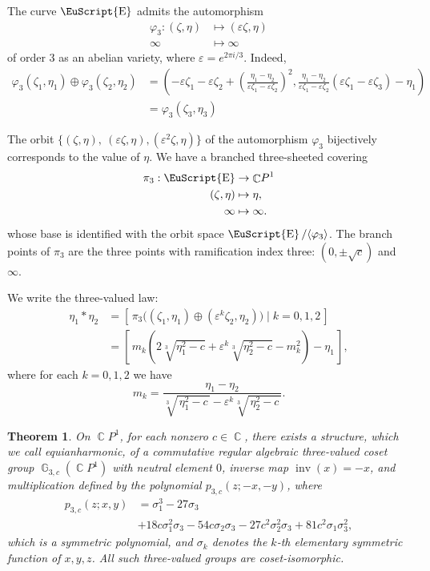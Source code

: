 \documentclass[14pt, dvipsnames]{extarticle}
\theoremstyle{plain}
\newtheorem{theorem}{Theorem}
\theoremstyle{definition}
\theoremstyle{remark}
\let\phi\varphi
\DeclareMathOperator{\E}{\EuScript{E}}
\DeclareMathOperator{\G}{\mathbb{G}}
\DeclareMathOperator{\inv}{\mathrm{inv}}
\DeclareMathOperator{\Cc}{\mathbb{C}}
\renewcommand{\epsilon}{\varepsilon}
\begin{document}
The curve $\E$ admits the automorphism
$$\begin{aligned}
\phi_3: (\zeta, \eta)&\mapsto (\epsilon \zeta, \eta)\\
\infty&\mapsto \infty
\end{aligned}$$
of order $3$ as an abelian variety, where $\epsilon = e^{2\pi i/3}$. Indeed,
$$\begin{aligned}
\phi_3(\zeta_1, \eta_1)\oplus \phi_3(\zeta_2, \eta_2) &= \left(- \epsilon \zeta_1 - \epsilon \zeta_2 + \left(\frac{\eta_1 - \eta_2}{\epsilon \zeta_1 - \epsilon \zeta_2}\right)^2, \frac{\eta_1 - \eta_2}{\epsilon \zeta_1-\epsilon \zeta_2}(\epsilon \zeta_1 - \epsilon \zeta_3) - \eta_1 \right)\\
&= \phi_3(\zeta_3, \eta_3)
\end{aligned}$$   

The orbit $\{(\zeta, \eta),\ (\epsilon \zeta, \eta), (\epsilon^2 \zeta, \eta)\}$ of the automorphism $\phi_3$ bijectively corresponds to the value of $\eta$. We have a branched three-sheeted covering
\[
\begin{aligned}
\pi_3:\E&\to \Cc\!P^1\\
(\zeta,\eta)&\mapsto \eta,\\
\infty&\mapsto\infty.
\end{aligned}
\]
whose base is identified with the orbit space $\E/\langle \phi_3 \rangle$. {The branch points of $\pi_3$ are the three points with ramification index three: $(0, \pm\sqrt{c})$ and $\infty$.} 

We write the three-valued law:
\begin{align}
\eta_1\ast \eta_2&=[\,\pi_3\bigl((\zeta_1,\eta_1)\oplus (\epsilon^k \zeta_2,\eta_2)\bigr)\mid k=0,1,2\,]\nonumber\\
&=\left[\,m_k\!\left(2\sqrt[3]{\eta_1^2-c}+\epsilon^k\sqrt[3]{\eta_2^2-c}-m_k^2\right)-\eta_1\,\right],\label{3_valued_law_multiset}
\end{align}
where for each $k = 0, 1, 2$ we have
$$m_k=\frac{\eta_1-\eta_2}{\sqrt[3]{\,\eta_1^2-c\,}-\epsilon^k\sqrt[3]{\,\eta_2^2-c\,}}.$$

\begin{theorem}\label{3-valued_group}
On $\Cc\!P^1$, for each nonzero $c\in\Cc$, there exists a structure, which we call equianharmonic, of a {commutative regular} algebraic three-valued coset group $\G_{3, c}(\Cc\!P^1)$ with neutral element $0$, inverse map $\inv(x) = -x$, and multiplication defined by the polynomial $p_{3, c}(z; -x, -y)$, where
$$\begin{aligned}
p_{3, c}(z; x, y) &= \sigma_1^3 - 27\sigma_3\\
&+ 18 c \sigma_1^2 \sigma_3 - 54 c \sigma_2 \sigma_3 - 27 c^2 \sigma_2^2 \sigma_3 + 81 c^2 \sigma_1 \sigma_3^2,
\end{aligned}$$
which is a symmetric polynomial, and $\sigma_k$ denotes the $k$-th elementary symmetric function of $x, y, z$. All such three-valued groups are {coset-isomorphic}.
\end{theorem}
\end{document}
